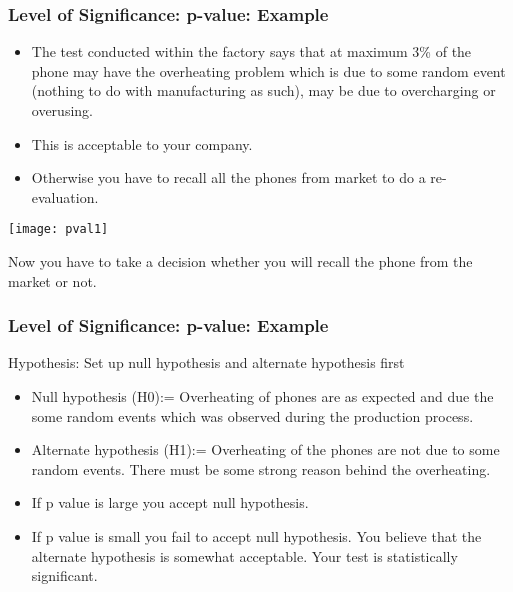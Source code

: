 \begin{frame}[fragile]\frametitle{Level of Significance: p-value: Example}

\begin{itemize}
\item The test conducted within the factory says that at maximum 3\% of the phone may have the overheating problem which is due to some random event (nothing to do with manufacturing as such), may be due to overcharging or overusing.
\item This is acceptable to your company. 
\item Otherwise you have to recall all the phones from market to do a re-evaluation.
\end{itemize}

\begin{center}
\texttt{[image: pval1]}
\end{center}

Now you have to take a decision whether you will recall the phone from the market or not.


\end{frame}

\begin{frame}[fragile]\frametitle{Level of Significance: p-value: Example}
Hypothesis: Set up null hypothesis and alternate hypothesis first
\begin{itemize}
\item Null hypothesis (H0):= Overheating of phones are as expected and due the some random events which was observed during the production process.
\item Alternate hypothesis (H1):= Overheating of the phones are not due to some random events. There must be some strong reason behind the overheating.
\item If p value is large you accept null hypothesis.
\item If p value is small you fail to accept null hypothesis. You believe that the alternate hypothesis is somewhat acceptable. Your test is statistically significant.
\end{itemize}



\end{frame}

